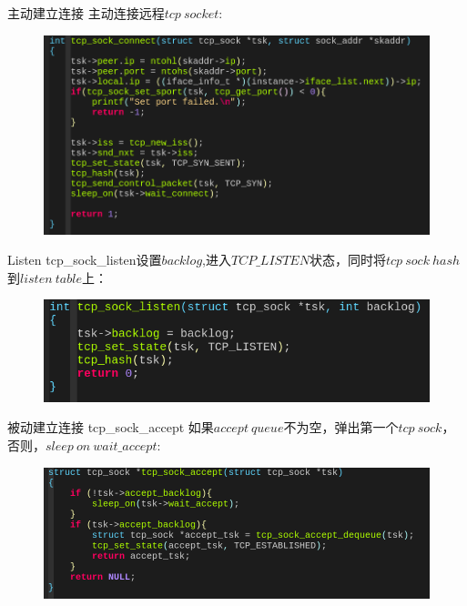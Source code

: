 \documentclass{beamer}
\begin{document}
\begin{frame}[fragile]{主动建立连接}
  主动连接远程$tcp\ socket$:
  \begin{figure}[H]
	\centering
	\includegraphics[scale = 0.35]{./fig/cnt.png}
  \end{figure}
\end{frame}

\begin{frame}{Listen}
{tcp\_sock\_listen}设置$backlog$,进入$TCP\_LISTEN$状态，同时将$tcp\ sock\ hash$到$listen\ table$上：
  \begin{figure}[H]
	\centering
	\includegraphics[scale = 0.4]{./fig/lst.png}
  \end{figure}
\end{frame}

\begin{frame}{被动建立连接}
{tcp\_sock\_accept} 如果$accept\ queue$不为空，弹出第一个$tcp\ sock$，否则，$sleep\ on\ wait\_accept$:
  \begin{figure}[H]
	\centering
	\includegraphics[scale = 0.35]{./fig/acp.png}
  \end{figure}
\end{frame}
\end{document}
